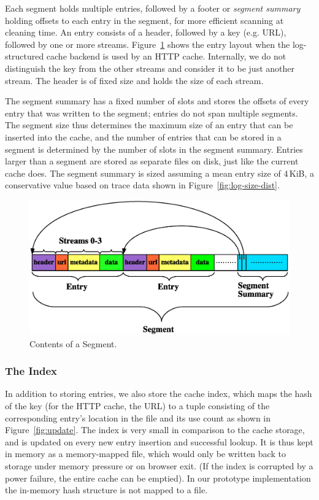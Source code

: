 \documentclass[letterpaper,twocolumn,10pt]{article}
\begin{document}
Each segment holds multiple entries, followed by a footer or \emph{segment
  summary} holding offsets to each entry in the segment, for more efficient
scanning at cleaning time.  An entry consists of a header, followed by a key
(e.g. URL), followed by one or more streams. Figure~\ref{fig:segment} shows the
entry layout when the log-structured cache backend is used by an HTTP cache.
Internally, we do not distinguish the key from the other streams and consider it
to be just another stream.  The header is of fixed size and holds the size of
each stream.

The segment summary has a fixed number of slots and stores the offsets of every
entry that was written to the segment; entries do not span multiple segments.
The segment size thus determines the maximum size of an entry that can be
inserted into the cache, and the number of entries that can be stored in a
segment is determined by the number of slots in the segment summary.  Entries
larger than a segment are stored as separate files on disk, just like the
current cache does.  The segment summary is sized assuming a mean entry size of
4\,KiB, a conservative value based on trace data shown in Figure~\ref{fig:log-size-dist}.

\begin{figure}[t]
  \begin{center}
    \includegraphics[width=0.9\columnwidth]{graphs/segment}
  \end{center}
  \caption{Contents of a Segment.}
  \label{fig:segment} 
\end{figure}

\subsubsection{The Index}
In addition to storing entries, we also store the cache index, which maps the
hash of the key (for the HTTP cache, the URL) to a tuple consisting of the
corresponding entry's location in the file and its use count as shown in
Figure~\ref{fig:update}.  The index is very small in comparison to the cache
storage, and is updated on every new entry insertion and successful lookup.  It
is thus kept in memory as a memory-mapped file, which would only be written back
to storage under memory pressure or on browser exit. (If the index is corrupted
by a power failure, the entire cache can be emptied).  In our prototype
implementation the in-memory hash structure is not mapped to a file.
\end{document}
